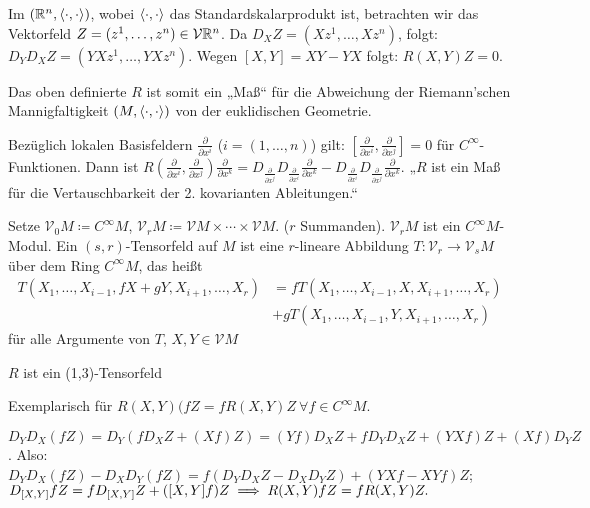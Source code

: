 \documentclass[a4paper,twoside,DIV15,BCOR12mm]{scrbook}
\renewcommand{\da}{\coloneqq}
\newcommand{\V}{\mathcal V}
\begin{document}
\begin{beispiel}
Im $(\mathbb{R}^n,\langle\cdot,\cdot\rangle)$, wobei $\langle\cdot,\cdot\rangle$ das Standardskalarprodukt ist, betrachten wir das Vektorfeld $Z=(z^1,\ldots,z^n)\in \V \MdR^n$. Da $D_XZ = (Xz^1,\ldots,Xz^n)$, folgt: $D_YD_XZ = (YXz^1,\ldots,YXz^n)$. Wegen $[X,Y] = XY-YX$ folgt: $R(X,Y)Z = 0$.
\end{beispiel}

Das oben definierte $R$ ist somit ein „Maß“ für die Abweichung der Riemann’schen Mannigfaltigkeit $(M,\langle\cdot,\cdot\rangle)$ von der euklidischen Geometrie.

\begin{bemerkung}
Bezüglich lokalen Basisfeldern $\frac{\partial}{\partial x^i}$ ($i=(1,\ldots,n)$) gilt: $[\frac\partial{\partial x^i},\frac\partial{\partial x^j}] = 0$ für $C^\infty$-Funktionen. Dann ist $R(\frac\partial{\partial x^i},\frac\partial{\partial x^j})\frac\partial{\partial x^k} = D_{\frac\partial{\partial x^j}}D_{\frac\partial{\partial x^i}} \frac\partial{\partial x^k} - D_{\frac\partial{\partial x^i}}D_{\frac\partial{\partial x^j}} \frac\partial{\partial x^k} $. „$R$ ist ein Maß für die Vertauschbarkeit der 2. kovarianten Ableitungen.“
\end{bemerkung}

\begin{definition}
Setze $\V_0M \da C^\infty M$, $\V_rM \da \V M\times \cdots \times \V M$. ($r$ Summanden). $\V_rM$ ist ein $C^\infty M$-Modul. Ein $(s,r)$-Tensorfeld auf $M$ ist eine $r$-lineare Abbildung $T:\V_r \to \V_sM$ über dem Ring $C^\infty M$, das heißt 
\begin{align*}
T(X_1,\ldots,X_{i-1},fX + gY,X_{i+1},\ldots, X_r) &=
f T(X_1,\ldots,X_{i-1},X,X_{i+1},\ldots, X_r)\\ &+
g T(X_1,\ldots,X_{i-1},Y,X_{i+1},\ldots, X_r) 
\end{align*}
für alle Argumente von $T$, $X,Y \in \V M$
\end{definition}

\begin{satz}
\label{tensorfeld}
$R$ ist ein (1,3)-Tensorfeld
\end{satz}
\begin{beweis}
Exemplarisch für $R(X,Y)(fZ = fR(X,Y)Z\ \forall f\in C^\infty M$.

$D_YD_X(fZ) = D_Y(fD_XZ + (Xf)Z) = (Yf)D_XZ + fD_YD_X Z + (YXf) Z + (Xf)D_YZ$. Also:
$D_YD_X(fZ) - D_XD_Y(fZ) = f(D_YD_XZ - D_XD_YZ) + (YXf - XYf)Z$; $D_{[X,Y]}fZ = fD_{[X,Y]}Z + ([X,Y]f)Z\implies R(X,Y)fZ = fR(X,Y)Z.$
\end{beweis}
\end{document}

